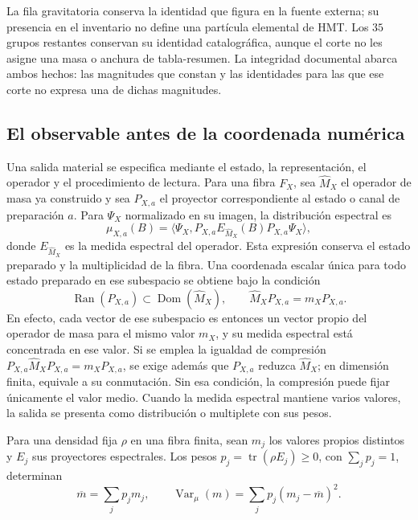 La fila gravitatoria conserva la identidad que figura en la fuente externa;
su presencia en el inventario no define una partícula elemental de HMT.
Los \(35\) grupos restantes conservan su identidad catalográfica, aunque
el corte no les asigne una masa o anchura de tabla-resumen. La integridad
documental abarca ambos hechos: las magnitudes que constan y las identidades
para las que ese corte no expresa una de dichas magnitudes.

\subsection{El observable antes de la coordenada numérica}
\label{subsec:vi-tipos-observable}

Una salida material se especifica mediante el estado, la representación,
el operador y el procedimiento de lectura. Para una fibra \(F_X\), sea
\(\widehat M_X\) el operador de masa ya construido y sea \(P_{X,a}\)
el proyector correspondiente al estado o canal de preparación \(a\).
Para \(\Psi_X\) normalizado en su imagen, la distribución espectral es
\[
 \mu_{X,a}(B)
 =\langle\Psi_X,
   P_{X,a}E_{\widehat M_X}(B)P_{X,a}\Psi_X\rangle,
\]
donde \(E_{\widehat M_X}\) es la medida espectral del operador. Esta
expresión conserva el estado preparado y la multiplicidad de la fibra.
Una coordenada escalar única para todo estado preparado en ese subespacio
se obtiene bajo la condición
\[
 \operatorname{Ran}(P_{X,a})\subset\operatorname{Dom}(\widehat M_X),
 \qquad \widehat M_XP_{X,a}=m_XP_{X,a}.
\]
En efecto, cada vector de ese subespacio es entonces un vector propio del
operador de masa para el mismo valor \(m_X\), y su medida espectral está
concentrada en ese valor. Si se emplea la igualdad de compresión
\(P_{X,a}\widehat M_XP_{X,a}=m_XP_{X,a}\), se exige además que
\(P_{X,a}\) reduzca \(\widehat M_X\); en dimensión finita, equivale
a su conmutación. Sin esa condición, la compresión puede fijar únicamente
el valor medio. Cuando la medida espectral mantiene varios valores, la
salida se presenta como distribución o multiplete con sus pesos.

Para una densidad fija \(\rho\) en una fibra finita, sean \(m_j\)
los valores propios distintos y \(E_j\) sus proyectores espectrales.
Los pesos \(p_j=\operatorname{tr}(\rho E_j)\geq0\), con
\(\sum_jp_j=1\), determinan
\[
 \overline m=\sum_jp_jm_j,\qquad
 \operatorname{Var}_{\mu}(m)=\sum_jp_j(m_j-\overline m)^2.
\]
